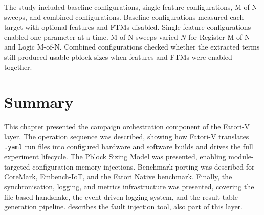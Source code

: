 The study included baseline configurations, single-feature configurations, M-of-N sweeps, and combined configurations. Baseline configurations measured each target with optional features and \acp{FTM} disabled. Single-feature configurations enabled one parameter at a time. M-of-N sweeps varied \(N\) for Register M-of-N and Logic M-of-N. Combined configurations checked whether the extracted terms still produced usable pblock sizes when features and \acp{FTM} were enabled together.



\section{Summary}
\label{chap7:summary}

This chapter presented the campaign orchestration component of the Fatori-V layer. The operation sequence was described, showing how \ac{Fatori-V} translates \texttt{.yaml} run files into configured hardware and software builds and drives the full experiment lifecycle. The Pblock Sizing Model was presented, enabling module-targeted configuration memory injections. Benchmark porting was described for CoreMark, Embench-IoT, and the Fatori Native benchmark. Finally, the synchronisation, logging, and metrics infrastructure was presented, covering the file-based handshake, the event-driven logging system, and the result-table generation pipeline.  describes the fault injection tool, also part of this layer.



